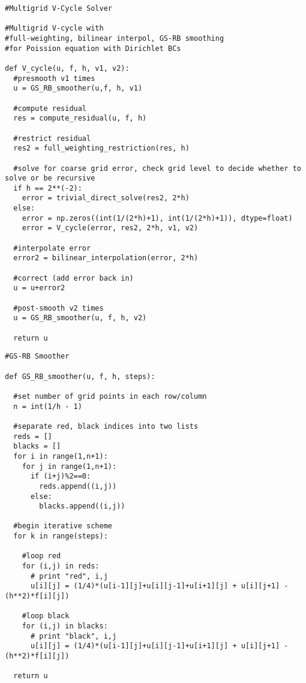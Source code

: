 \documentclass[12pt]{article}
\begin{document}
\newpage
\begin{verbatim}
#Multigrid V-Cycle Solver

#Multigrid V-cycle with
#full-weighting, bilinear interpol, GS-RB smoothing
#for Poission equation with Dirichlet BCs 

def V_cycle(u, f, h, v1, v2):
  #presmooth v1 times
  u = GS_RB_smoother(u,f, h, v1)

  #compute residual
  res = compute_residual(u, f, h)

  #restrict residual
  res2 = full_weighting_restriction(res, h)

  #solve for coarse grid error, check grid level to decide whether to solve or be recursive
  if h == 2**(-2):
    error = trivial_direct_solve(res2, 2*h)
  else:
    error = np.zeros((int(1/(2*h)+1), int(1/(2*h)+1)), dtype=float)
    error = V_cycle(error, res2, 2*h, v1, v2) 

  #interpolate error
  error2 = bilinear_interpolation(error, 2*h)

  #correct (add error back in)
  u = u+error2

  #post-smooth v2 times
  u = GS_RB_smoother(u, f, h, v2)

  return u
\end{verbatim}
\newpage
\begin{verbatim}
#GS-RB Smoother

def GS_RB_smoother(u, f, h, steps):

  #set number of grid points in each row/column
  n = int(1/h - 1)
  
  #separate red, black indices into two lists
  reds = []
  blacks = []
  for i in range(1,n+1):
    for j in range(1,n+1):
      if (i+j)%2==0:
        reds.append((i,j))
      else:
        blacks.append((i,j))

  #begin iterative scheme
  for k in range(steps):

    #loop red 
    for (i,j) in reds:
      # print "red", i,j
      u[i][j] = (1/4)*(u[i-1][j]+u[i][j-1]+u[i+1][j] + u[i][j+1] - (h**2)*f[i][j])
    
    #loop black 
    for (i,j) in blacks:
      # print "black", i,j
      u[i][j] = (1/4)*(u[i-1][j]+u[i][j-1]+u[i+1][j] + u[i][j+1] - (h**2)*f[i][j])

  return u
\end{verbatim}

\newpage
\end{document}
